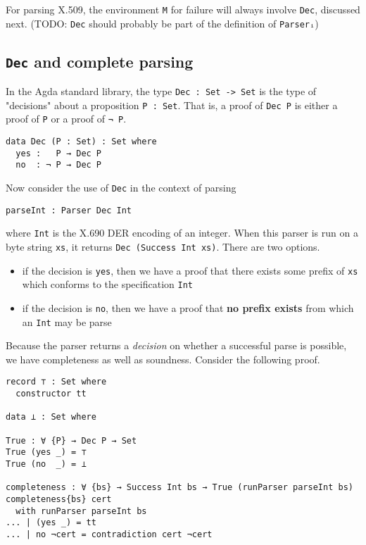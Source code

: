 \documentclass[11pt]{article}
\begin{document}
For parsing X.509, the environment \texttt{M} for failure will always involve \texttt{Dec},
discussed next. (TODO: \texttt{Dec} should probably be part of the definition of \texttt{Parserᵢ})

\subsection{\texttt{Dec} and complete parsing}
\label{sec:org7fad137}

In the Agda standard library, the type \texttt{Dec : Set -> Set} is the type of
"decisions" about a proposition \texttt{P : Set}.
That is, a proof of \texttt{Dec P} is either a proof of \texttt{P} or a proof of \texttt{¬ P}.

\begin{verbatim}
data Dec (P : Set) : Set where
  yes :   P → Dec P
  no  : ¬ P → Dec P
\end{verbatim}

Now consider the use of \texttt{Dec} in the context of parsing

\begin{verbatim}
parseInt : Parser Dec Int
\end{verbatim}

where \texttt{Int} is the X.690 DER encoding of an integer.
When this parser is run on a byte string \texttt{xs}, it returns \texttt{Dec (Success Int
    xs)}. There are two options.
\begin{itemize}
\item if the decision is \texttt{yes}, then we have a proof that there exists some
prefix of \texttt{xs} which conforms to the specification \texttt{Int}

\item if the decision is \texttt{no}, then we have a proof that \textbf{no prefix exists}
from which an \texttt{Int} may be parse
\end{itemize}


Because the parser returns a \emph{decision} on whether a successful parse is
possible, we have completeness as well as soundness.
Consider the following proof.

\begin{verbatim}
record ⊤ : Set where
  constructor tt

data ⊥ : Set where

True : ∀ {P} → Dec P → Set
True (yes _) = ⊤
True (no  _) = ⊥

completeness : ∀ {bs} → Success Int bs → True (runParser parseInt bs)
completeness{bs} cert
  with runParser parseInt bs
... | (yes _) = tt
... | no ¬cert = contradiction cert ¬cert
\end{verbatim}
\end{document}
